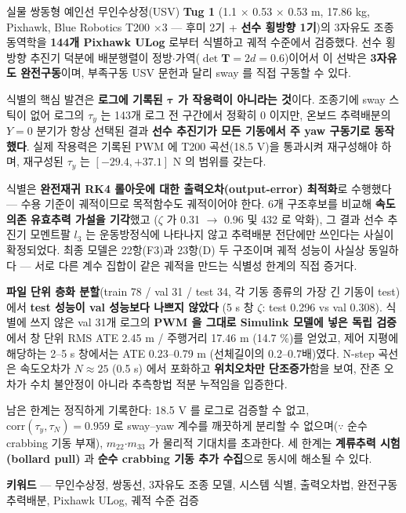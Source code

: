 \documentclass[10pt,a4paper]{article}
\begin{document}
실물 쌍동형 예인선 무인수상정(USV) \textbf{Tug 1} (1.1 $\times$ 0.53 $\times$ 0.53 m, 17.86 kg, Pixhawk, Blue Robotics T200 $\times$3 --- 후미 2기 + \textbf{선수 횡방향 1기})의 3자유도 조종 동역학을 \textbf{144개 Pixhawk ULog} 로부터 식별하고 궤적 수준에서 검증했다. 선수 횡방향 추진기 덕분에 배분행렬이 정방$\cdot$가역($\det\mathbf{T} = 2d = 0.6$)이어서 이 선박은 \textbf{3자유도 완전구동}이며, 부족구동 USV 문헌과 달리 sway 를 직접 구동할 수 있다.

식별의 핵심 발견은 \textbf{로그에 기록된 $\boldsymbol{\tau}$ 가 작용력이 아니라는 것}이다. 조종기에 sway 스틱이 없어 로그의 $\tau_y$ 는 143개 로그 전 구간에서 정확히 0 이지만, 온보드 추력배분의 $Y = 0$ 분기가 항상 선택된 결과 \textbf{선수 추진기가 모든 기동에서 주 yaw 구동기로 동작했다}. 실제 작용력은 기록된 PWM 에 T200 곡선(18.5 V)을 통과시켜 재구성해야 하며, 재구성된 $\tau_y$ 는 $[-29.4, +37.1]$ N 의 범위를 갖는다.

식별은 \textbf{완전재귀 RK4 롤아웃에 대한 출력오차(output-error) 최적화}로 수행했다 --- 수용 기준이 궤적이므로 목적함수도 궤적이어야 한다. 6개 구조후보를 비교해 \textbf{속도의존 유효추력 가설을 기각}했고 ($\zeta$ 가 0.31 $\to$ 0.96 및 432 로 악화), 그 결과 선수 추진기 모멘트팔 $l_3$ 는 운동방정식에 나타나지 않고 추력배분 전단에만 쓰인다는 사실이 확정되었다. 최종 모델은 22항(F3)과 23항(D) 두 구조이며 궤적 성능이 사실상 동일하다 --- 서로 다른 계수 집합이 같은 궤적을 만드는 식별성 한계의 직접 증거다.

\textbf{파일 단위 층화 분할}(train 78 / val 31 / test 34, 각 기동 종류의 가장 긴 기동이 test)에서 \textbf{test 성능이 val 성능보다 나쁘지 않았다} (5 s 창 $\zeta$: test 0.296 vs val 0.308). 식별에 쓰지 않은 val 31개 로그의 \textbf{PWM 을 그대로 Simulink 모델에 넣은 독립 검증}에서 창 단위 RMS ATE 2.45 m / 주행거리 17.46 m (14.7 \%)를 얻었고, 제어 지평에 해당하는 2--5 s 창에서는 ATE 0.23--0.79 m (선체길이의 0.2--0.7배)였다. N-step 곡선은 속도오차가 $N \approx 25$ (0.5 s) 에서 포화하고 \textbf{위치오차만 단조증가}함을 보여, 잔존 오차가 수치 불안정이 아니라 추측항법 적분 누적임을 입증한다.

남은 한계는 정직하게 기록한다: 18.5 V 를 로그로 검증할 수 없고, $\mathrm{corr}(\tau_y, \tau_N) = 0.959$ 로 sway--yaw 계수를 깨끗하게 분리할 수 없으며($\because$ 순수 crabbing 기동 부재), $m_{22}$$\cdot$$m_{33}$ 가 물리적 기대치를 초과한다. 세 한계는 \textbf{계류추력 시험(bollard pull)} 과 \textbf{순수 crabbing 기동 추가 수집}으로 동시에 해소될 수 있다.

\textbf{키워드} --- 무인수상정, 쌍동선, 3자유도 조종 모델, 시스템 식별, 출력오차법, 완전구동 추력배분, Pixhawk ULog, 궤적 수준 검증
\end{document}
